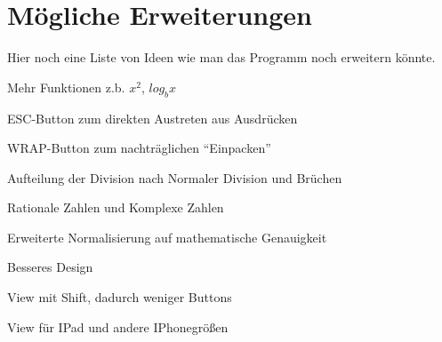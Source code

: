 \chapter{Mögliche Erweiterungen}
Hier noch eine Liste von Ideen wie man das Programm noch erweitern könnte.

\item Mehr Funktionen z.b. $x^2$, $log_b x$
\item ESC-Button zum direkten Austreten aus Ausdrücken
\item WRAP-Button zum nachträglichen ``Einpacken''
\item Aufteilung der Division nach Normaler Division und Brüchen
\item Rationale Zahlen und Komplexe Zahlen
\item Erweiterte Normalisierung auf mathematische Genauigkeit
\item Besseres Design
\item View mit Shift, dadurch weniger Buttons
\item View für IPad und andere IPhonegrößen

